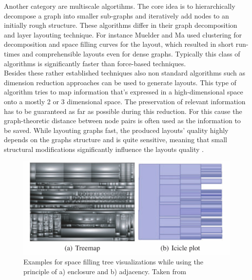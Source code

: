Another category are multiscale algortihms. The core idea is to hierarchically decompose a graph into smaller sub-graphs and iteratively add nodes to an initially rough structure. These algorithms differ in their graph decomposition and layer layouting technique. For instance Muelder and Ma \cite{Muelder2008} used clustering for decomposition and space filling curves for the layout, which resulted in short run-times and comprehensible layouts even for dense graphs. Typically this class of algorithms is significantly faster than force-based techniques\cite{VonLandesberger2011}. \\
Besides these rather established techniques also non standard algorithms such as dimension reduction approaches can be used to generate layouts. This type of algorithm tries to map information that's expressed in a high-dimensional space onto a mostly 2 or 3 dimensional space. The preservation of relevant information has to be guaranteed as far as possible during this reduction. For this cause the graph-theoretic distance between node pairs is often used as the information to be saved. While layouting graphs fast, the produced layouts' quality highly depends on the graphs structure and is quite sensitive, meaning that small structural modifications significantly influence the layouts quality\cite{Gibson2013} \cite{VonLandesberger2011}.

\begin{figure}
    \centering
    \includegraphics{media/space_filling_trees.pdf}
    \caption{Examples for space filling tree visualizations while using the principle of a) enclosure and b) adjacency. Taken from \cite{VonLandesberger2011}}
    \label{fig:space_filling_trees}
\end{figure}

